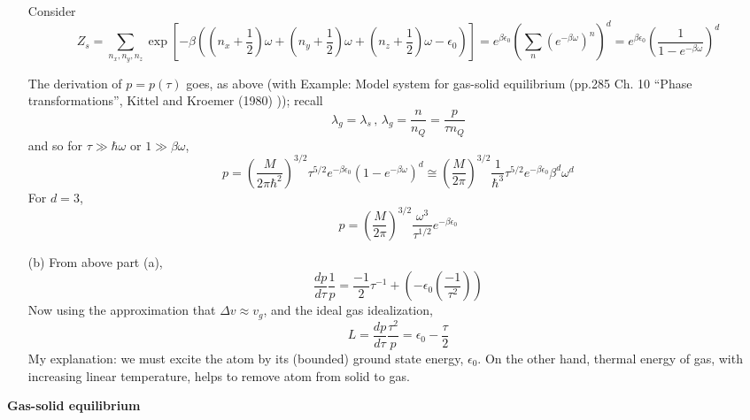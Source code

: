 \begin{enumerate}
Consider 
\[
Z_s = \sum_{n_x,n_y,n_z} \exp{ \left[ - \beta((n_x + \frac{1}{2} )\omega + (n_y + \frac{1}{2}) \omega + (n_z + \frac{1}{2} )\omega -\epsilon_0 ) \right] } = e^{\beta \epsilon_0} \left( \sum_n (e^{-\beta \omega })^n \right)^d = e^{\beta \epsilon_0} \left( \frac{1}{ 1 - e^{-\beta \omega } } \right)^d
\]

The derivation of $p = p(\tau)$ goes, as above (with Example: Model system for gas-solid equilibrium (pp.285 Ch. 10 ``Phase transformations'', Kittel and Kroemer (1980) \cite{CKittelHKroemer1980})); recall
\[
\lambda_g = \lambda_s \, ,  \, \lambda_g = \frac{n}{n_Q} = \frac{p}{\tau n_Q}
\]
and so for $\tau \gg \hbar \omega$ or $1 \gg \beta \omega$, 
\[
p = \left( \frac{M}{2\pi \hbar^2} \right)^{3/2} \tau^{5/2} e^{-\beta \epsilon_0}(1- e^{-\beta \omega} )^d \cong \left( \frac{M}{2\pi } \right)^{3/2} \frac{1}{\hbar^3} \tau^{5/2} e^{-\beta \epsilon_0} \beta^d \omega^d
\]
For $d=3$,
\[
\boxed{ p = \left( \frac{M}{2\pi }\right)^{3/2} \frac{\omega^3}{\tau^{1/2}} e^{-\beta \epsilon_0} }
\]



\item[(b)] 
From above part (a),
\[
\frac{dp}{d\tau}\frac{1}{p} = \frac{-1}{2} \tau^{-1} + (-\epsilon_0 \left( \frac{-1}{\tau^2} \right) )
\]
Now using the approximation that $\Delta v \approx v_g$, and the ideal gas idealization,
\[
L = \frac{dp}{d\tau} \frac{\tau^2}{p} = \epsilon_0 - \frac{\tau}{2}
\]
My explanation: we must excite the atom by its (bounded) ground state energy, $\epsilon_0$.  On the other hand, thermal energy of gas, with increasing linear temperature, helps to remove atom from solid to gas.  
\end{enumerate} 


 \textbf{Gas-solid equilibrium}

